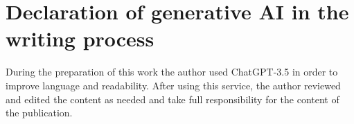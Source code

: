 \documentclass[preprint,12pt]{elsarticle}
\begin{document}
\section*{Declaration of generative AI in the writing process}

During the preparation of this work the author used ChatGPT-3.5 in order to improve language and readability. After using this service, the author reviewed and edited the content as needed and take full responsibility for the content of the publication.





  
 





\end{document}
